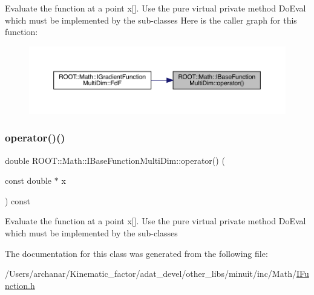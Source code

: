 Evaluate the function at a point x\mbox{[}\mbox{]}. Use the pure virtual private method Do\+Eval which must be implemented by the sub-\/classes Here is the caller graph for this function\+:\nopagebreak
\begin{figure}[H]
\begin{center}
\leavevmode
\includegraphics[width=350pt]{d0/d87/classROOT_1_1Math_1_1IBaseFunctionMultiDim_a7efd1892dc6473b3f8aaaff3cbb8bb2f_icgraph}
\end{center}
\end{figure}
\mbox{\label{classROOT_1_1Math_1_1IBaseFunctionMultiDim_a7efd1892dc6473b3f8aaaff3cbb8bb2f}} 
\subsubsection{\texorpdfstring{operator()()}{operator()()}\hspace{0.1cm}{\footnotesize\ttfamily [2/2]}}
{\footnotesize\ttfamily double R\+O\+O\+T\+::\+Math\+::\+I\+Base\+Function\+Multi\+Dim\+::operator() (\begin{DoxyParamCaption}\item[{const double $\ast$}]{x }\end{DoxyParamCaption}) const\hspace{0.3cm}{\ttfamily [inline]}}

Evaluate the function at a point x\mbox{[}\mbox{]}. Use the pure virtual private method Do\+Eval which must be implemented by the sub-\/classes 

The documentation for this class was generated from the following file\+:\begin{DoxyCompactItemize}
\item 
/\+Users/archanar/\+Kinematic\+\_\+factor/adat\+\_\+devel/other\+\_\+libs/minuit/inc/\+Math/\mbox{\hyperlink{other__libs_2minuit_2inc_2Math_2IFunction_8h}{I\+Function.\+h}}\end{DoxyCompactItemize}
